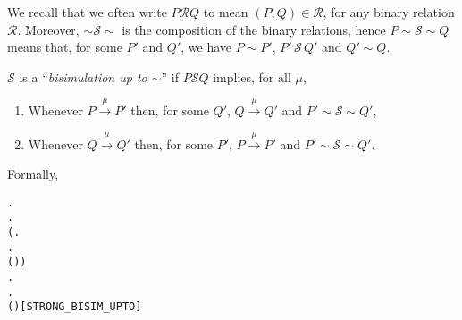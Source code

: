 We recall that we often write $P\mathcal{R} Q$ to mean
$(P, Q) \in \mathcal{R}$, for any binary relation $\mathcal{R}$. 
Moreover, 
 $\sim \mathcal{S} \sim$ is the composition of the binary
relations, hence $P \sim \mathcal{S} \sim Q$ means that, for some
$P'$ and $Q'$, we have $P \sim P'$, $P' \,\mathcal{S}\, Q'$ and $Q' \sim Q$.
\begin{definition}
$\mathcal{S}$ is a ``\emph{bisimulation up to $\sim$}'' if $P
  \mathcal{S} Q$ implies, for all $\mu$,
\begin{enumerate}
\item Whenever $P \overset{\mu}{\rightarrow} P'$ then, for some
  $Q'$, $Q \overset{\mu}{\rightarrow} Q'$ and $P' \sim \mathcal{S}
  \sim Q'$,
\item Whenever $Q \overset{\mu}{\rightarrow} Q'$ then, for some
  $P'$, $P \overset{\mu}{\rightarrow} P'$ and $P' \sim \mathcal{S}
  \sim Q'$.
\end{enumerate}
Formally,
\begin{alltt}
  \HOLSymConst{\HOLTokenDefEquality{}}
  \HOLSymConst{\HOLTokenForall{}} .
         \HOLSymConst{\HOLTokenImp{}}
      \HOLSymConst{\HOLTokenForall{}}.
          (\HOLSymConst{\HOLTokenForall{}}.
                \HOLTokenTransBegin{}\HOLTokenTransEnd {} \HOLSymConst{\HOLTokenImp{}}
               \HOLSymConst{\HOLTokenExists{}}.
                    \HOLTokenTransBegin{}\HOLTokenTransEnd {} \HOLSymConst{\HOLTokenConj{}}
                   ( \HOLSymConst{\HOLTokenRCompose{}}  \HOLSymConst{\HOLTokenRCompose{}} )  ) \HOLSymConst{\HOLTokenConj{}}
          \HOLSymConst{\HOLTokenForall{}}.
               \HOLTokenTransBegin{}\HOLTokenTransEnd {} \HOLSymConst{\HOLTokenImp{}}
              \HOLSymConst{\HOLTokenExists{}}.
                   \HOLTokenTransBegin{}\HOLTokenTransEnd {} \HOLSymConst{\HOLTokenConj{}}
                  ( \HOLSymConst{\HOLTokenRCompose{}}  \HOLSymConst{\HOLTokenRCompose{}} )  \hfill{[STRONG_BISIM_UPTO]}
\end{alltt}
\end{definition}

